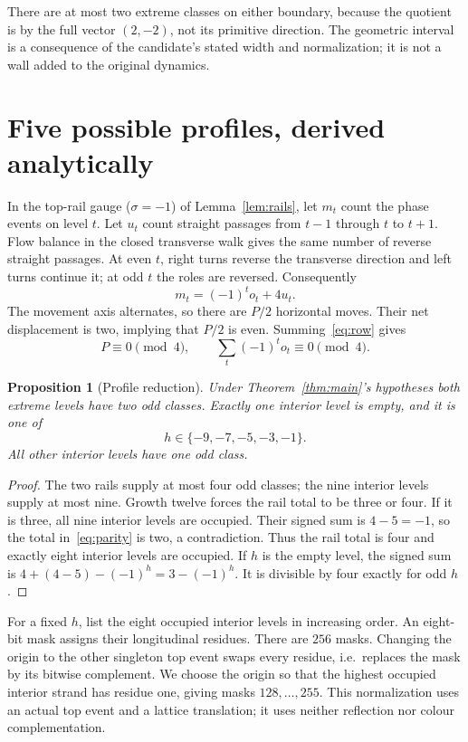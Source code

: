 \documentclass[11pt]{article}
\newtheorem{proposition}[theorem]{Proposition}
\theoremstyle{definition}\newtheorem{definition}[theorem]{Definition}
\begin{document}
There are at most two extreme classes on either boundary, because the quotient
is by the full vector $(2,-2)$, not its primitive direction. The geometric
interval is a consequence of the candidate's stated width and normalization;
it is not a wall added to the original dynamics.

\section{Five possible profiles, derived analytically}
In the top-rail gauge ($\sigma=-1$) of Lemma~\ref{lem:rails}, let $m_t$ count
the phase events on level $t$. Let $u_t$ count straight passages
from $t-1$ through $t$ to $t+1$. Flow balance in the closed transverse walk gives
the same number of reverse straight passages. At even $t$, right turns reverse
the transverse direction and left turns continue it; at odd $t$ the roles
are reversed. Consequently
\begin{equation}\label{eq:row}
m_t=(-1)^t o_t+4u_t.
\end{equation}
The movement axis alternates, so there are $P/2$ horizontal moves. Their net
displacement is two, implying that $P/2$ is even. Summing~\eqref{eq:row} gives
\begin{equation}\label{eq:parity}
P\equiv0\pmod4,\qquad \sum_t(-1)^t o_t\equiv0\pmod4.
\end{equation}

\begin{proposition}[Profile reduction]\label{prop:profiles}
Under Theorem~\ref{thm:main}'s hypotheses both extreme levels have two odd
classes. Exactly one interior level is empty, and it is one of
\[
h\in\{-9,-7,-5,-3,-1\}.
\]
All other interior levels have one odd class.
\end{proposition}
\begin{proof}
The two rails supply at most four odd classes; the nine interior levels supply
at most nine. Growth twelve forces the rail total to be three or four. If it
is three, all nine interior levels are occupied. Their signed sum is $4-5=-1$,
so the total in~\eqref{eq:parity} is two, a contradiction.
Thus the rail total is four and exactly eight interior levels are occupied.
If $h$ is the empty level, the signed sum is
$4+(4-5)-(-1)^h=3-(-1)^h$. It is divisible by four exactly for odd $h$.
\end{proof}

For a fixed $h$, list the eight occupied interior levels in increasing order.
An eight-bit mask assigns their longitudinal residues. There are $256$ masks.
Changing the origin to the other singleton top event swaps every residue,
i.e.\ replaces the mask by its bitwise complement. We choose the origin so
that the highest occupied interior strand has residue one, giving masks
$128,\ldots,255$. This normalization uses an actual top event and a lattice
translation; it uses neither reflection nor colour complementation.
\end{document}

